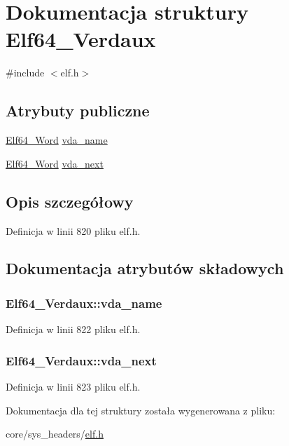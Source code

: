 \hypertarget{struct_elf64___verdaux}{\section{Dokumentacja struktury Elf64\-\_\-\-Verdaux}
\label{struct_elf64___verdaux}
}


{\ttfamily \#include $<$elf.\-h$>$}

\subsection*{Atrybuty publiczne}
\begin{DoxyCompactItemize}
\item 
\hyperlink{elf_8h_aa3aa1920ed115b7ef7e99716fece4401}{Elf64\-\_\-\-Word} \hyperlink{struct_elf64___verdaux_a76ef57da3e7a6f477d867b378dd976ce}{vda\-\_\-name}
\item 
\hyperlink{elf_8h_aa3aa1920ed115b7ef7e99716fece4401}{Elf64\-\_\-\-Word} \hyperlink{struct_elf64___verdaux_a550488ec793293fb872d8ec696faf9ff}{vda\-\_\-next}
\end{DoxyCompactItemize}


\subsection{Opis szczegółowy}


Definicja w linii 820 pliku elf.\-h.



\subsection{Dokumentacja atrybutów składowych}
\hypertarget{struct_elf64___verdaux_a76ef57da3e7a6f477d867b378dd976ce}{
\subsubsection[{vda\-\_\-name}]{ Elf64\-\_\-\-Verdaux\-::vda\-\_\-name}}\label{struct_elf64___verdaux_a76ef57da3e7a6f477d867b378dd976ce}


Definicja w linii 822 pliku elf.\-h.

\hypertarget{struct_elf64___verdaux_a550488ec793293fb872d8ec696faf9ff}{
\subsubsection[{vda\-\_\-next}]{ Elf64\-\_\-\-Verdaux\-::vda\-\_\-next}}\label{struct_elf64___verdaux_a550488ec793293fb872d8ec696faf9ff}


Definicja w linii 823 pliku elf.\-h.



Dokumentacja dla tej struktury została wygenerowana z pliku\-:\begin{DoxyCompactItemize}
\item 
core/sys\-\_\-headers/\hyperlink{elf_8h}{elf.\-h}\end{DoxyCompactItemize}
